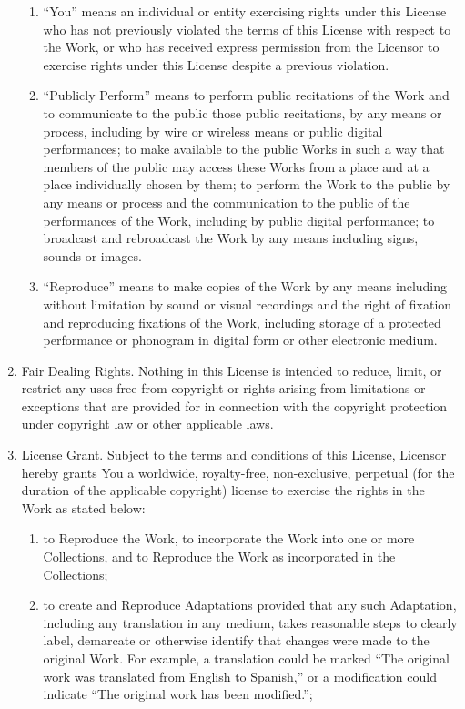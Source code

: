 \documentclass[letterpaper,10pt,english]{manual}
\begin{document}
\begin{enumerate}
\begin{enumerate}
\item {} 
``You'' means an individual or entity exercising rights under this License who has not previously violated the terms of this License with respect to the Work, or who has received express permission from the Licensor to exercise rights under this License despite a previous violation.

\item {} 
``Publicly Perform'' means to perform public recitations of the Work and to communicate to the public those public recitations, by any means or process, including by wire or wireless means or public digital performances; to make available to the public Works in such a way that members of the public may access these Works from a place and at a place individually chosen by them; to perform the Work to the public by any means or process and the communication to the public of the performances of the Work, including by public digital performance; to broadcast and rebroadcast the Work by any means including signs, sounds or images.

\item {} 
``Reproduce'' means to make copies of the Work by any means including without limitation by sound or visual recordings and the right of fixation and reproducing fixations of the Work, including storage of a protected performance or phonogram in digital form or other electronic medium.

\end{enumerate}

\item {} 
Fair Dealing Rights. Nothing in this License is intended to reduce, limit, or restrict any uses free from copyright or rights arising from limitations or exceptions that are provided for in connection with the copyright protection under copyright law or other applicable laws.

\item {} 
License Grant. Subject to the terms and conditions of this License, Licensor hereby grants You a worldwide, royalty-free, non-exclusive, perpetual (for the duration of the applicable copyright) license to exercise the rights in the Work as stated below:
\begin{enumerate}
\item {} 
to Reproduce the Work, to incorporate the Work into one or more Collections, and to Reproduce the Work as incorporated in the Collections;

\item {} 
to create and Reproduce Adaptations provided that any such Adaptation, including any translation in any medium, takes reasonable steps to clearly label, demarcate or otherwise identify that changes were made to the original Work. For example, a translation could be marked ``The original work was translated from English to Spanish,'' or a modification could indicate ``The original work has been modified.'';


\end{enumerate}
\end{enumerate}
\end{document}

